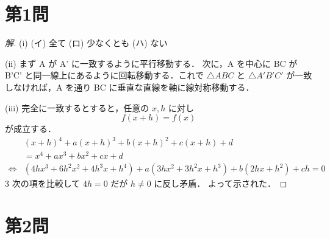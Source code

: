 \documentclass[../main.tex]{subfiles}
\begin{document}
\section*{第1問}

\begin{proof}[解]
  (i) (イ) 全て \quad (ロ) 少なくとも \quad (ハ) ない

  \bigskip
  (ii) まず A が A' に一致するように平行移動する．
  次に，A を中心に BC が B'C' と同一線上にあるように回転移動する．これで $\triangle ABC$ と $\triangle A'B'C'$ が一致しなければ，A を通り BC に垂直な直線を軸に線対称移動する．

  \bigskip
  (iii) 完全に一致するとすると，任意の $x, h$ に対し
  \[
    f(x+h) = f(x)
  \]
  が成立する．
  \begin{align*}
    &(x+h)^4 + a(x+h)^3 + b(x+h)^2 + c(x+h) + d \\
    &= x^4 + ax^3 + bx^2 + cx + d \\
    \iff &(4h x^3 + 6h^2 x^2 + 4h^3 x + h^4) + a(3h x^2 + 3h^2 x + h^3) + b(2hx + h^2) + ch = 0
  \end{align*}
  $3$ 次の項を比較して $4h = 0$ だが $h \neq 0$ に反し矛盾．
  よって示された．
\end{proof}

\newpage

\section*{第2問}
\end{document}
